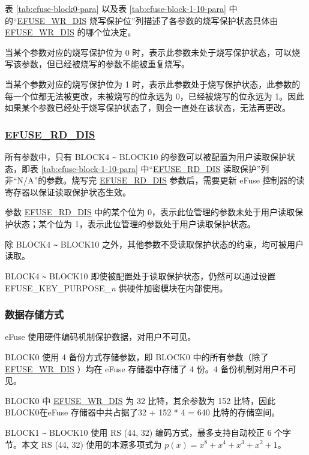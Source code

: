 \documentclass[main\_\_CN.tex]{subfiles}
\begin{document}
表 \ref{tab:efuse-block0-para} 以及表 \ref{tab:efuse-block-1-10-para} 中的“\hyperref[fielddesc:EFUSEWRDIS]{EFUSE\_WR\_DIS} 烧写保护位”列描述了各参数的烧写保护状态具体由 \hyperref[fielddesc:EFUSEWRDIS]{EFUSE\_WR\_DIS} 的哪个位决定。

当某个参数对应的烧写保护位为 0 时，表示此参数未处于烧写保护状态，可以烧写该参数，但已经被烧写的参数不能被重复烧写。

当某个参数对应的烧写保护位为 1 时，表示此参数处于烧写保护状态，此参数的每一个位都无法被更改，未被烧写的位永远为 0，已经被烧写的位永远为 1。因此如果某个参数已经处于烧写保护状态了，则会一直处在该状态，无法再更改。

\subsubsection{\hyperref[fielddesc:EFUSERDDIS]{EFUSE\_RD\_DIS}}
\label{sec:efuse-rd-dis}

所有参数中，只有 BLOCK4 \verb+~+ BLOCK10 的参数可以被配置为用户读取保护状态，即表 \ref{tab:efuse-block-1-10-para} 中“\hyperref[fielddesc:EFUSERDDIS]{EFUSE\_RD\_DIS} 读取保护”列非“N/A”的参数。烧写完 \hyperref[fielddesc:EFUSERDDIS]{EFUSE\_RD\_DIS} 参数后，需要更新 eFuse 控制器的读寄存器以保证读取保护状态生效。

参数 \hyperref[fielddesc:EFUSERDDIS]{EFUSE\_RD\_DIS} 中的某个位为 0，表示此位管理的参数未处于用户读取保护状态；某个位为 1，表示此位管理的参数处于用户读取保护状态。

除 BLOCK4 \verb+~+ BLOCK10 之外，其他参数不受读取保护状态的约束，均可被用户读取。

BLOCK4 \verb+~+ BLOCK10 即使被配置处于读取保护状态，仍然可以通过设置 EFUSE\_KEY\_PURPOSE\_\textcolor{myred}{\it{n}} 供硬件加密模块在内部使用。

\subsubsection{数据存储方式}
\label{sec:efuse-data-storage}

eFuse 使用硬件编码机制保护数据，对用户不可见。

BLOCK0 使用 4 备份方式存储参数，即 BLOCK0 中的所有参数（除了 \hyperref[fielddesc:EFUSEWRDIS]{EFUSE\_WR\_DIS} ）均在 eFuse 存储器中存储了 4 份。4 备份机制对用户不可见。

BLOCK0 中 \hyperref[fielddesc:EFUSEWRDIS]{EFUSE\_WR\_DIS} 为 32 比特，其余参数为 152 比特，因此BLOCK0在eFuse 存储器中共占据了32 + 152 * 4 = 640 比特的存储空间。

BLOCK1 \verb+~+ BLOCK10 使用 RS (44, 32) 编码方式，最多支持自动校正 6 个字节。本文 RS (44, 32) 使用的本源多项式为 \(p(x)=x^8+x^4+x^3+x^2+1\)。
\end{document}
